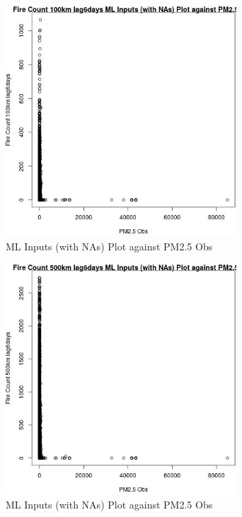 \begin{figure} 
\centering  
\includegraphics[width=0.77\textwidth]{Code_Outputs/Report_ML_input_PM25_Step4_part_f_de_duplicated_aves_prioritize_24hr_obswNAs_Fire_Count_100km_lag6daysvPM25_Obs.jpg} 
\caption{\label{fig:Report_ML_input_PM25_Step4_part_f_de_duplicated_aves_prioritize_24hr_obswNAsFire_Count_100km_lag6daysvPM25_Obs}ML Inputs (with NAs) Plot against PM2.5 Obs} 
\end{figure} 
 

\begin{figure} 
\centering  
\includegraphics[width=0.77\textwidth]{Code_Outputs/Report_ML_input_PM25_Step4_part_f_de_duplicated_aves_prioritize_24hr_obswNAs_Fire_Count_500km_lag6daysvPM25_Obs.jpg} 
\caption{\label{fig:Report_ML_input_PM25_Step4_part_f_de_duplicated_aves_prioritize_24hr_obswNAsFire_Count_500km_lag6daysvPM25_Obs}ML Inputs (with NAs) Plot against PM2.5 Obs} 
\end{figure} 
 

